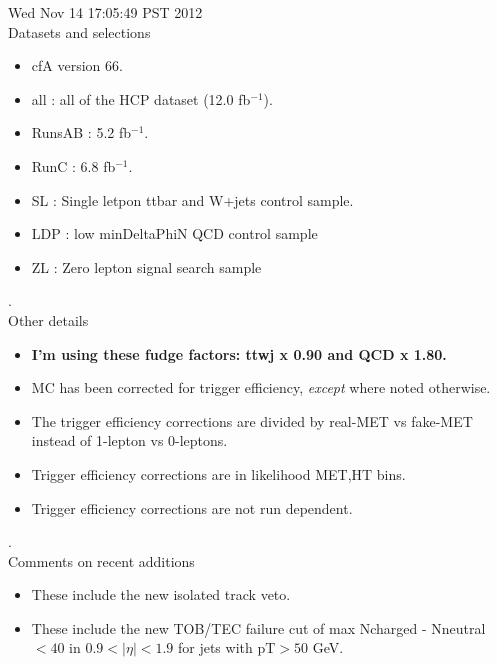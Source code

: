 \documentclass[11pt]{article}
\begin{document}
  Wed Nov 14 17:05:49 PST 2012 \\


   Datasets and selections
   \begin{itemize}
     \item cfA version 66.
     \item all : all of the HCP dataset (12.0 fb$^{-1}$).
     \item RunsAB : 5.2 fb$^{-1}$.
     \item RunC : 6.8 fb$^{-1}$.
     \item SL : Single letpon ttbar and W+jets control sample.
     \item LDP : low minDeltaPhiN QCD control sample
     \item ZL : Zero lepton signal search sample
   \end{itemize}

.\\

   Other details
   \begin{itemize}
     \item {\bf I'm using these fudge factors: ttwj x 0.90 and QCD x 1.80.}
     \item MC has been corrected for trigger efficiency, {\it except} where noted otherwise.
     \item  The trigger efficiency corrections are divided by real-MET vs fake-MET
             instead of 1-lepton vs 0-leptons.
     \item Trigger efficiency corrections are in likelihood MET,HT bins.
     \item Trigger efficiency corrections are not run dependent.
   \end{itemize}

.\\

  Comments on recent additions
  \begin{itemize}
     \item These include the new isolated track veto.
     \item These include the new TOB/TEC failure cut of max Ncharged - Nneutral $<40$ in $0.9<|\eta|<1.9$ for
             jets with pT$>50$ GeV.
   \end{itemize}
\end{document}
